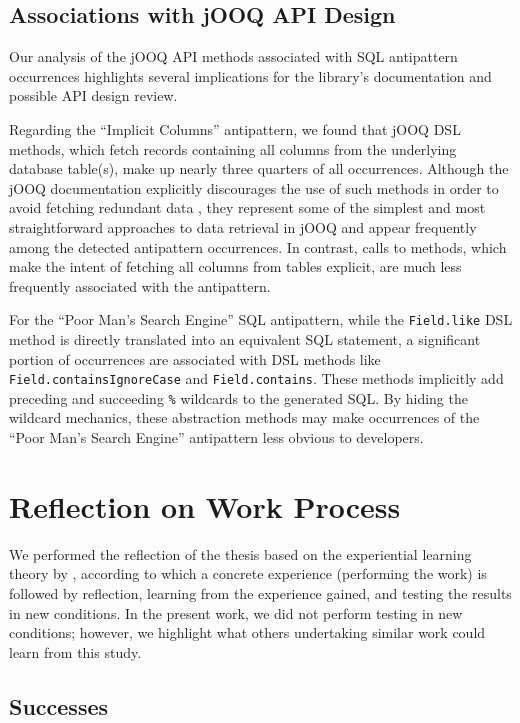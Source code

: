 \subsection{Associations with jOOQ API Design}\label{sec:apiDesign}

Our analysis of the jOOQ API methods associated with SQL antipattern occurrences highlights several implications for the library’s documentation and possible API design review.

Regarding the “Implicit Columns” antipattern, we found that jOOQ DSL methods, which fetch records containing all columns from the underlying database table(s), make up nearly three quarters of all occurrences. Although the jOOQ documentation explicitly discourages the use of such methods in order to avoid fetching redundant data , they represent some of the simplest and most straightforward approaches to data retrieval in jOOQ and appear frequently among the detected antipattern occurrences. In contrast, calls to methods, which make the intent of fetching all columns from tables explicit, are much less frequently associated with the antipattern.

For the “Poor Man's Search Engine” SQL antipattern, while the \texttt{Field.like} DSL method is directly translated into an equivalent SQL statement, a significant portion of occurrences are associated with DSL methods like \texttt{Field.containsIgnoreCase} and \texttt{Field.contains}. These methods implicitly add preceding and succeeding \texttt{\%} wildcards to the generated SQL. By hiding the wildcard mechanics, these abstraction methods may make occurrences of the “Poor Man's Search Engine” antipattern less obvious to developers.

\section{Reflection on Work Process}\label{sec:reflection}

We performed the reflection of the thesis based on the experiential learning theory by , according to which a concrete experience (performing the work) is followed by reflection, learning from the experience gained, and testing the results in new conditions. In the present work, we did not perform testing in new conditions; however, we highlight what others undertaking similar work could learn from this study.

\subsection{Successes}

